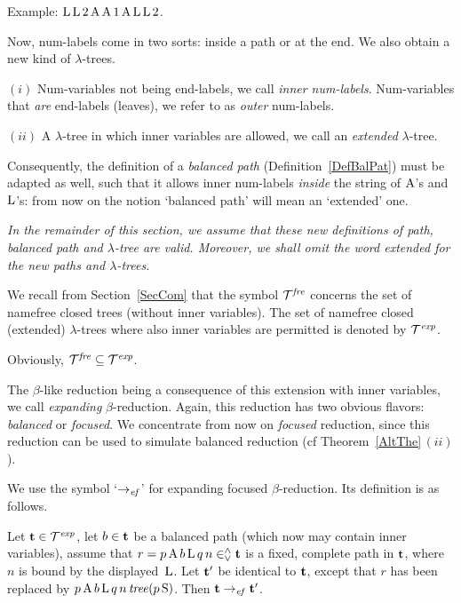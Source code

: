 \documentclass[submission,copyright,creativecommons]{eptcs}
\begin{document}
Example: ${\rm L} \, {\rm L} \, 2 \, {\rm A} \, {\rm A} \, 1 \, {\rm A} \, {\rm L} \, {\rm L} \, 2$.

\smallskip

Now, num-labels come in two sorts: inside a path or at the end. We also obtain a new kind of $\lambda$-trees.

\begin{Def}\label{DefInnOut}
$(i)$ Num-variables not being end-labels, we call {\it inner num-labels\/}.
Num-variables that {\it are\/} end-labels (leaves), we refer to as {\it outer\/} num-labels.

$(ii)$ A $\lambda$-tree in which inner variables are allowed, we call an {\em extended\/} $\lambda$-tree.
\end{Def}

Consequently, the definition of a {\it balanced path\/} (Definition~\ref{DefBalPat}) must be adapted as well, such that it allows inner num-labels {\em inside\/} the string of ${\rm A}$'s and ${\rm L}$'s: from now on the notion `balanced path' will mean an `extended' one.

\smallskip

{\it In the remainder of this section, we assume that these new definitions of path, balanced path and $\lambda$-tree are valid. Moreover, we shall omit the word {\em extended} for the new paths and $\lambda$-trees.}

\smallskip

We recall from Section~\ref{SecCom} that the symbol ${\cal T}^{\it fre}$ concerns the set of namefree closed trees (without inner variables).
The set of namefree closed (extended) $\lambda$-trees where also inner variables are permitted is denoted by ${\cal T}^{\it exp}$.

Obviously, ${\cal T}^{\it fre} \subseteq {\cal T}^{\it exp}$.

\smallskip

The $\beta$-like reduction being a consequence of this extension with inner variables, we call {\it expanding\/} $\beta$-reduction. Again, this reduction has two obvious flavors: {\it balanced\/} or {\it focused\/}. We concentrate from now on {\em focused\/} reduction, since this reduction can be used to simulate balanced reduction (cf Theorem~\ref{AltThe}\,$(ii)$).

We use the symbol `$\rightarrow_{\it ef}$' for expanding focused $\beta$-reduction. Its definition is as follows.

\begin{Def}\label{DefBetDel}
Let ${\bf t} \in {\cal T}^{\it exp}$, let $b \in {\bf t}$ be a balanced path (which now may contain inner variables), assume that $r = p \, {\rm A} \, b \, {\rm L} \, q \, n \in^{\wedge}_{\vee} {\bf t}$ is a fixed, complete path in ${\bf t}$, where $n$ is bound by the displayed~${\rm L}$. Let ${\bf t}'$ be identical to ${\bf t}$, except that $r$ has been replaced by $p \, {\rm A} \, b \, {\rm L} \, q \, n \, {\it tree}(p \, {\rm S})$.
Then ${\bf t} \rightarrow_{\it ef} {\bf t}'$.

\end{Def}
\end{document}
